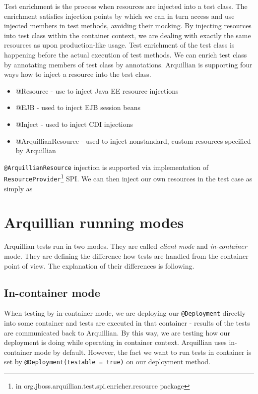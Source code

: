 \documentclass[12pt,final,oneside]{fithesis}
\begin{document}
Test enrichment is the process when resources are injected into a test class. The enrichment satisfies injection points by which we can in turn access and use injected members in test methods, avoiding their mocking. By injecting resources into test class within the container context, we are dealing with exactly the same resources as upon production-like usage. Test enrichment of the test class is happening before the actual execution of test methods. We can enrich test class by annotating members of test class by annotations. Arquillian is supporting four ways how to inject a resource into the test class.

\begin{itemize}
\item{@Resource - use to inject Java EE resource injections}
\item{@EJB - used to inject EJB session beans}
\item{@Inject - used to inject CDI injections}
\item{@ArquillianResource - used to inject nonstandard, custom resources specified by Arquillian}
\end{itemize}

\texttt{@ArquillianResource} injection is supported via implementation of \texttt{ResourceProvider}\footnote{in org.jboss.arquillian.test.spi.enricher.resource package} SPI. We can then inject our own resources in the test case as simply as



	\section{Arquillian running modes}
	
Arquillian tests run in two modes. They are called \textit{client mode} and \textit{in-container} mode. They are defining the difference how tests are handled from the container point of view. The explanation of their differences is following.

		\subsection{In-container mode}
		
When testing by in-container mode, we are deploying our \texttt{@Deployment} directly into some container and tests are executed in that container - results of the tests are communicated back to Arquillian. By this way, we are testing how our deployment is doing while operating in container context. Arquillian uses in-container mode by default. However, the fact we want to run tests in container is set by \texttt{@Deployment(testable = true)} on our deployment method.
\end{document}
